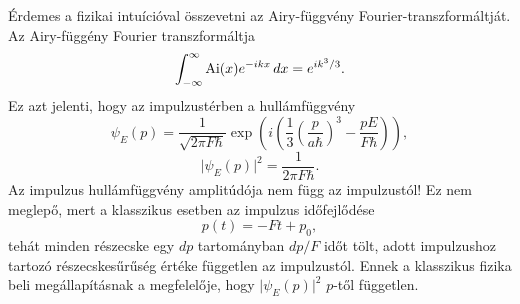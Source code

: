 Érdemes a fizikai intuícióval összevetni az Airy-függvény Fourier-transzformáltját. Az Airy-függény Fourier transzformáltja
\begin{equation}
	\int_{-\infty}^\infty\operatorname{Ai}(x)e^{-ikx}\,dx=e^{ik^3/3}.
\end{equation}
Ez azt jelenti, hogy az impulzustérben a hullámfüggvény
\begin{equation}
	\psi_E(p)=\frac{1}{\sqrt{2\pi F\hbar}}\exp\left(i\left(\frac{1}{3}\left(\frac{p}{a\hbar}\right)^3-\frac{pE}{F\hbar}\right)\right),
\end{equation}
\begin{equation}
	\rvert\psi_E(p)\lvert^2=\frac{1}{2\pi F\hbar}.
\end{equation}
Az impulzus hullámfüggvény amplitúdója nem függ az impulzustól! Ez nem meglepő, mert a klasszikus esetben az impulzus időfejlődése 
\begin{equation}
	p(t)=-Ft+p_0,
\end{equation}
tehát minden részecske egy $dp$ tartományban $dp/F$ időt tölt, adott impulzushoz tartozó részecskesűrűség értéke független az impulzustól. Ennek a klasszikus fizika beli megállapításnak a megfelelője, hogy $\lvert\psi_E(p)\rvert^2$ $p$-től független.







